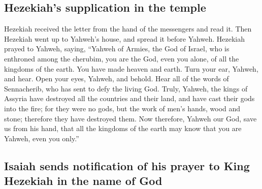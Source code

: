 \hypertarget{hezekiahs-supplication-in-the-temple}{%
\subsection{Hezekiah's supplication in the
temple}\label{hezekiahs-supplication-in-the-temple}}

 Hezekiah received the letter from the hand of the
messengers and read it. Then Hezekiah went up to Yahweh's house, and
spread it before Yahweh.  Hezekiah prayed to Yahweh,
saying,  ``Yahweh of Armies, the God of Israel, who is
enthroned among the cherubim, you are the God, even you alone, of all
the kingdoms of the earth. You have made heaven and earth.
 Turn your ear, Yahweh, and hear. Open your eyes, Yahweh,
and behold. Hear all of the words of Sennacherib, who has sent to defy
the living God.  Truly, Yahweh, the kings of Assyria have
destroyed all the countries and their land,  and have
cast their gods into the fire; for they were no gods, but the work of
men's hands, wood and stone; therefore they have destroyed them.
 Now therefore, Yahweh our God, save us from his hand,
that all the kingdoms of the earth may know that you are Yahweh, even
you only.''

\hypertarget{isaiah-sends-notification-of-his-prayer-to-king-hezekiah-in-the-name-of-god}{%
\subsection{Isaiah sends notification of his prayer to King Hezekiah in
the name of
God}\label{isaiah-sends-notification-of-his-prayer-to-king-hezekiah-in-the-name-of-god}}

